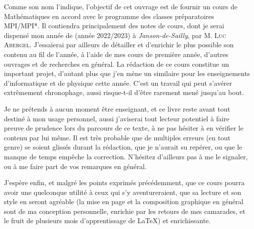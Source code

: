 \documentclass[a4paper,french,bookmarks]{book}
\begin{document}
    \newline\newline\newline
    
    \begin{center}
        \begin{minipage}{0.85\linewidth}
            \large \qquad Comme son nom l'indique, l'objectif de cet ouvrage est de fournir un cours de Mathématiques en accord avec le programme des classes préparatoires \textsf{MPI/MPI*}. Il contiendra principalement des notes de cours, dont je serai dispensé mon année de  (année 2022/2023) à \textit{Janson-de-Sailly}, par M. \textsc{Luc Abergel}. J'essaierai par ailleurs de détailler et d'enrichir le plus possible son contenu au fil de l'année, à l'aide de mes cours de première année, d'autres ouvrages et de recherches en général. La rédaction de ce cours constitue un important projet, d'autant plus que j'en mène un similaire pour les enseignements d'informatique et de physique cette année. C'est un travail qui peut s'avérer extrêmement chronophage, aussi risque-t-il d'être rarement mené jusqu'au bout.\newline
    
            \qquad Je ne prétends à aucun moment être enseignant, et ce livre reste avant tout destiné à mon usage personnel, aussi j'aviserai tout lecteur potentiel à faire preuve de prudence lors du parcours de ce texte, à ne pas hésiter à en vérifier le contenu par lui même. Il est très probable que de multiples erreurs (en tout genre) se soient glissés durant la rédaction, que je n'aurait su repérer, ou que le manque de temps empêche la correction. N'hésitez d'ailleurs pas à me le signaler, ou à me faire part de vos remarques en général.\newline
    
            \qquad J'espère enfin, et malgré les points exprimés précédemment, que ce cours pourra avoir une quelconque utilité à ceux qui s'y aventureraient, que sa lecture et son style en seront agréable (la mise en page et la composition graphique en général sont de ma conception personnelle, enrichie par les retours de mes camarades, et le fruit de plusieurs mois d'apprentissage de \LaTeX) et enrichissante.\newline\newline\newline\text{}
        \end{minipage}
    \end{center}
    
\end{document}
